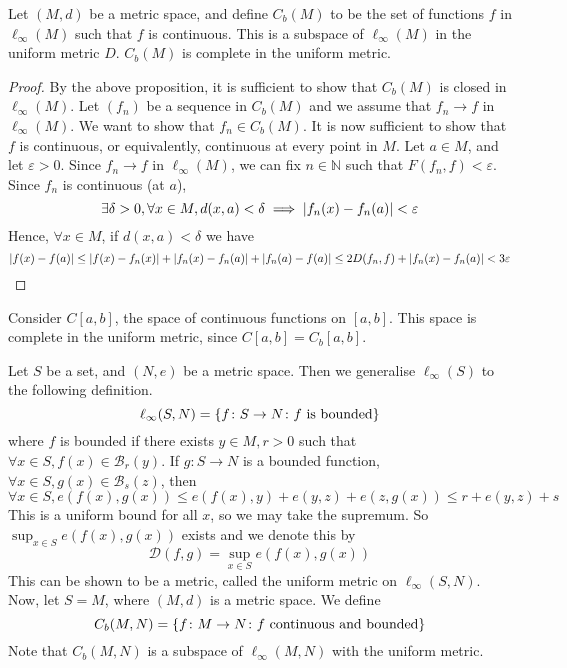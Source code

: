 \begin{theorem}
    Let \( (M, d) \) be a metric space, and define \( C_b(M) \) to be the set of functions \( f \) in \( \ell_\infty(M) \) such that \( f \) is continuous.
    This is a subspace of \( \ell_\infty(M) \) in the uniform metric \( D \).
    \( C_b(M) \) is complete in the uniform metric.
\end{theorem}
\begin{proof}
    By the above proposition, it is sufficient to show that \( C_b(M) \) is closed in \( \ell_\infty(M) \).
    Let \( (f_n) \) be a sequence in \( C_b(M) \) and we assume that \( f_n \to f \) in \( \ell_\infty(M) \).
    We want to show that \( f_n \in C_b(M) \).
    It is now sufficient to show that \( f \) is continuous, or equivalently, continuous at every point in \( M \).
    Let \( a \in M \), and let \( \varepsilon > 0 \).
    Since \( f_n \to f \) in \( \ell_\infty(M) \), we can fix \( n \in \mathbb N \) such that \( F(f_n,f) < \varepsilon \).
    Since \( f_n \) is continuous (at \( a \)),
    \[ \exists \delta > 0, \forall x \in M, d(x,a) < \delta \implies \abs{f_n(x) - f_n(a)} < \varepsilon \]
    Hence, \( \forall x \in M \), if \( d(x,a) < \delta \) we have
    \[ \abs{f(x) - f(a)} \leq \abs{f(x) - f_n(x)} + \abs{f_n(x) - f_n(a)} + \abs{f_n(a) - f(a)} \leq 2 D(f_n,f) + \abs{f_n(x) - f_n(a)} < 3\varepsilon \]
\end{proof}
\begin{corollary}
    Consider \( C[a,b] \), the space of continuous functions on \( [a,b] \).
    This space is complete in the uniform metric, since \( C[a,b] = C_b[a,b] \).
\end{corollary}
\begin{definition}
    Let \( S \) be a set, and \( (N,e) \) be a metric space.
    Then we generalise \( \ell_\infty(S) \) to the following definition.
    \[ \ell_\infty(S,N) = \qty{f \colon S \to N \colon f \text{ is bounded}} \]
    where \( f \) is bounded if there exists \( y \in M, r > 0 \) such that \( \forall x \in S, f(x) \in \mathcal B_r(y) \).
    If \( g \colon S \to N \) is a bounded function, \( \forall x \in S, g(x) \in \mathcal B_s(z) \), then
    \[ \forall x \in S, e(f(x),g(x)) \leq e(f(x),y) + e(y,z) + e(z,g(x)) \leq r + e(y,z) + s \]
    This is a uniform bound for all \( x \), so we may take the supremum.
    So \( \sup_{x \in S} e(f(x), g(x)) \) exists and we denote this by
    \[ \mathcal D(f,g) = \sup_{x \in S} e(f(x), g(x)) \]
    This can be shown to be a metric, called the uniform metric on \( \ell_\infty(S,N) \).
    Now, let \( S = M \), where \( (M,d) \) is a metric space.
    We define
    \[ C_b(M, N) = \qty{f \colon M \to N \colon f \text{ continuous and bounded}} \]
    Note that \( C_b(M,N) \) is a subspace of \( \ell_\infty(M,N) \) with the uniform metric.
\end{definition}

